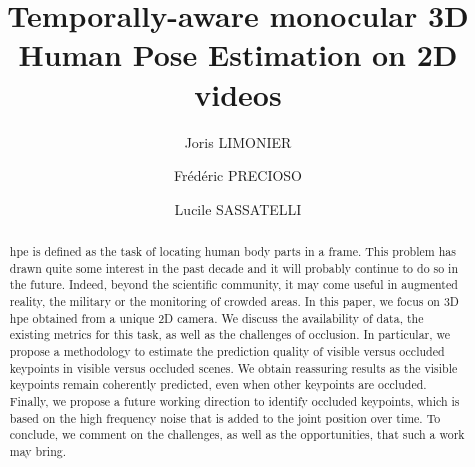 \documentclass[runningheads]{llncs}
\begin{document}
\title{Temporally-aware monocular 3D Human Pose Estimation on 2D videos}

\author{
  Joris LIMONIER   \and
  Frédéric PRECIOSO   \and
  Lucile SASSATELLI  
}
%
%
%
\maketitle              %
%
\begin{abstract}
  \ac{hpe} is defined as the task of locating human body parts in a frame. This problem has drawn quite some interest in the past decade and it will probably continue to do so in the future. Indeed, beyond the scientific community, it may come useful in augmented reality, the military or the monitoring of crowded areas. In this paper, we focus on 3D \ac{hpe} obtained from a unique 2D camera. We discuss the availability of data, the existing metrics for this task, as well as the challenges of occlusion. In particular, we propose a methodology to estimate the prediction quality of visible versus occluded keypoints in visible versus occluded scenes. We obtain reassuring results as the visible keypoints remain coherently predicted, even when other keypoints are occluded. Finally, we propose a future working direction to identify occluded keypoints, which is based on the high frequency noise that is added to the joint position over time. To conclude, we comment on the challenges, as well as the opportunities, that such a work may bring.
\end{abstract}
\acresetall
\end{document}
